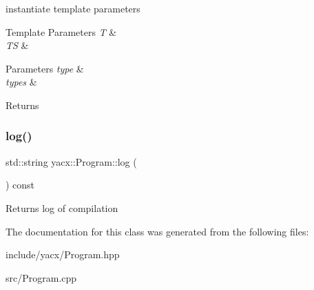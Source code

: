 instantiate template parameters 
\begin{DoxyTemplParams}{Template Parameters}
{\em T} & \\
\hline
{\em TS} & \\
\hline
\end{DoxyTemplParams}

\begin{DoxyParams}{Parameters}
{\em type} & \\
\hline
{\em types} & \\
\hline
\end{DoxyParams}
\begin{DoxyReturn}{Returns}

\end{DoxyReturn}
\mbox{\label{classyacx_1_1_program_a0d9e7de768dcbfb251b83737bcaec772}} 
\subsubsection{\texorpdfstring{log()}{log()}}
{\footnotesize\ttfamily std\+::string yacx\+::\+Program\+::log (\begin{DoxyParamCaption}{ }\end{DoxyParamCaption}) const\hspace{0.3cm}{\ttfamily [inline]}}

\begin{DoxyReturn}{Returns}
log of compilation 
\end{DoxyReturn}


The documentation for this class was generated from the following files\+:\begin{DoxyCompactItemize}
\item 
include/yacx/Program.\+hpp\item 
src/Program.\+cpp\end{DoxyCompactItemize}
